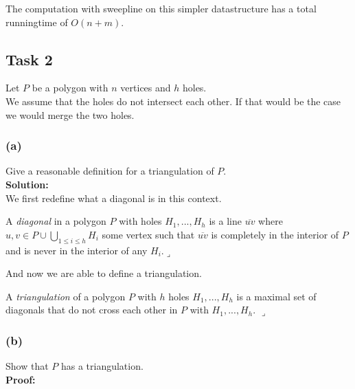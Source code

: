 \documentclass[11pt,a4paper,ngerman]{article}
\begin{document}
The computation with sweepline on this simpler datastructure has a total runningtime of $O(n+m)$.

\subsection*{Task 2}
Let $P$ be a polygon with $n$ vertices and $h$ holes.\\

We assume that the holes do not intersect each other. If that would be the case we would merge the two holes.

\subsubsection*{(a)}
Give a reasonable definition for a triangulation of $P$.\\

\textbf{Solution:}\\


We first redefine what a diagonal is in this context.

\begin{def}\label{alge:ueb3:holes:def1}
    A \emph{diagonal} in a polygon $P$ with holes $H_1,...,H_h$ is a line $\overline{uv}$ where $u,v \in P \cup \bigcup_{1\leq i \leq h} H_i$
    some vertex such that $\overline{uv}$ is completely in the interior of $P$ and is never in the interior of any $H_i$.\mbox{}\hfill$\lrcorner$
\end{def}

And now we are able to define a triangulation.

\begin{def}\label{alge:ueb3:hole:def2}
    A \emph{triangulation} of a polygon $P$ with $h$ holes $H_1, ..., H_h$ is a maximal set of diagonals 
    that do not cross each other in $P$ with $H_1, ... ,H_h$.
    \mbox{}\hfill$\lrcorner$
\end{def}

\subsubsection*{(b)}
Show that $P$ has a triangulation.\\

\textbf{Proof:}\\
\end{document}
